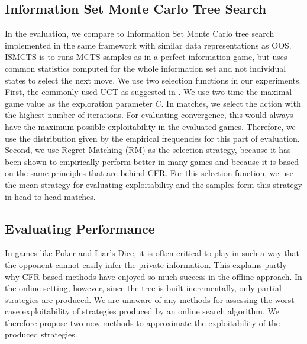 \documentclass{aamas2015}
\begin{document}
\subsection{Information Set Monte Carlo Tree Search}
In the evaluation, we compare to Information Set Monte Carlo tree search implemented in the same framework with similar data representations as OOS. ISMCTS is to runs MCTS samples as in a perfect information game, but uses common statistics computed for the whole information set and not individual states to select the next move. We use two selection functions in our experiments. First, the commonly used UCT as suggested in \cite{Cowling12ISMCTS}. We use two time the maximal game value as the exploration parameter $C$. In matches, we select the action with the highest number of iterations. For evaluating convergence, this would always have the maximum possible exploitability in the evaluated games. Therefore, we use the distribution given by the empirical frequencies for this part of evaluation. Second, we use Regret Matching (RM) as the selection strategy, because it has been shown to empirically perform better in many games \cite{Lisy14selection} and because it is based on the same principles that are behind CFR. For this selection function, we use the mean strategy for evaluating exploitability and the samples form this strategy in head to head matches.

\subsection{Evaluating Performance}\label{sec:evaluating}

In games like Poker and Liar's Dice, it is often critical to play in such a way that the opponent 
cannot easily infer the private information. This explains partly why CFR-based methods have 
enjoyed so much success in the offline approach. 
In the online setting, however, since the tree is built incrementally, only partial strategies
are produced. 
We are unaware of any methods for assessing the worst-case exploitability of strategies 
produced by an online search algorithm. 
We therefore propose two new methods to approximate the exploitability of the produced strategies. 
\end{document}
